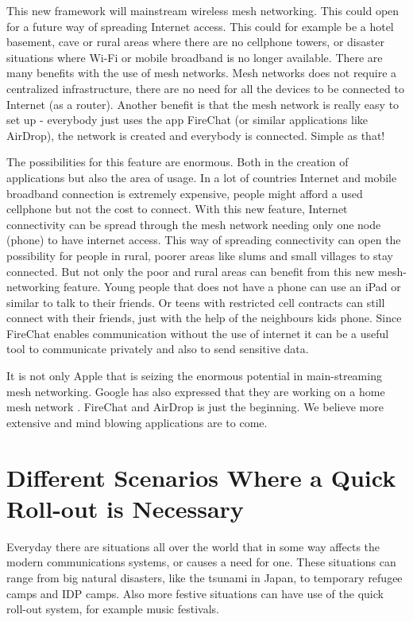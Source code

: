 This new framework will mainstream wireless mesh networking. This could open for a future way of spreading Internet access. This could for example be a hotel basement, cave or rural areas where there are no cellphone towers, or disaster situations where Wi-Fi or mobile broadband  is no longer available. There are many benefits with the use of mesh networks. Mesh networks does not require a centralized infrastructure, there are no need for all the devices to be connected to Internet (as a router). Another benefit is that the mesh network is really easy to set up - everybody just uses the app FireChat (or similar applications like AirDrop), the network is created and everybody is connected. Simple as that! 

The possibilities for this feature are enormous. Both in the creation of applications but also the area of usage. In a lot of countries Internet and mobile broadband connection is extremely expensive, people might afford a used cellphone but not the cost to connect. With this new feature, Internet connectivity can be spread through the mesh network needing only one node (phone) to have internet access. This way of spreading connectivity can open the possibility for people in rural, poorer areas like slums and small villages to stay connected. But not only the poor and rural areas can benefit from this new mesh-networking feature. Young people that does not have a phone can use an iPad or similar to talk to their friends. Or teens with restricted cell contracts can still connect with their friends, just with the help of the neighbours kids phone. Since FireChat enables communication without the use of internet it can be a useful tool to communicate privately and also to send sensitive data.
 
It is not only Apple that is seizing the enormous potential in main-streaming mesh networking. Google has also expressed that they are working on a home mesh network \cite{googleMesh}. FireChat and AirDrop is just the beginning. We believe more extensive and mind blowing applications are to come. 
 
\section{Different Scenarios Where a Quick Roll-out is Necessary}

Everyday there are situations all over the world that in some way affects the modern communications systems, or causes a need for one.  These situations can range from big natural disasters, like the tsunami in Japan, to temporary refugee camps and IDP camps. Also more festive situations can have use of the quick roll-out system, for example music festivals. 

